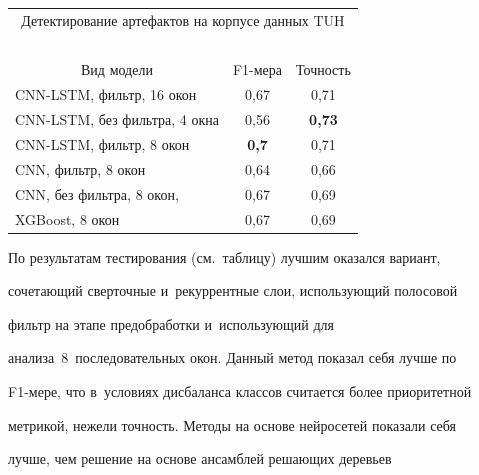 \begin{table}\small

\begin{center}

\begin{tabular}{|l|c|c|}

\multicolumn{3}{c}{Детектирование артефактов на корпусе данных TUH}\\

\multicolumn{3}{c}{\ }\\[-6pt]

\hline

\multicolumn{1}{|c|}{Вид модели}&F1-мера&Точность\\

\hline

CNN-LSTM, фильтр, 16 окон&0,67&0,71\\

CNN-LSTM, без фильтра, 4 окна&0,56&\textbf{0,73}\\

CNN-LSTM, фильтр, 8 окон&\textbf{0,7}\hphantom{9}&0,71\\

CNN, фильтр, 8 окон&0,64&0,66\\

CNN, без фильтра, 8 окон, &0,67&0,69\\

XGBoost, 8 окон&0,67&0,69\\

\hline

\end{tabular}

\end{center}

\end{table}



     По результатам тестирования (см.\ таблицу) лучшим оказался вариант, 

со\-че\-та\-ющий сверточные и~рекуррентные слои, использующий полосовой 

фильтр на этапе предобработки и~использующий для 

анализа~8~последовательных окон. Данный метод показал себя лучше по  

F1-ме\-ре, что в~условиях дисбаланса классов считается более приоритетной 

метрикой, нежели точность. Методы на основе нейросетей показали себя 

лучше, чем решение на основе ансамблей решающих деревьев 

